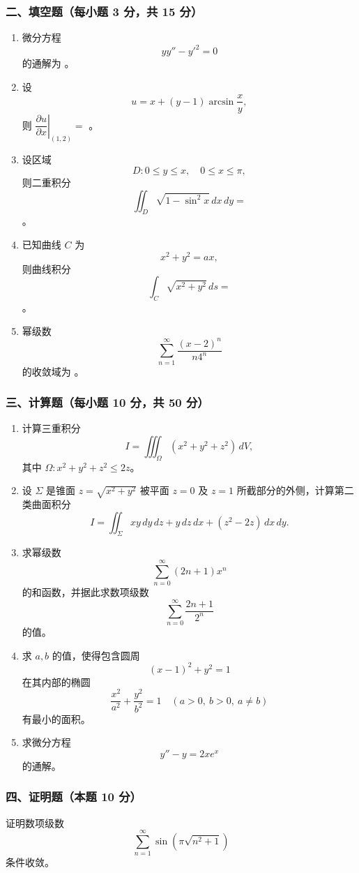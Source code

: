 \subsubsection*{二、填空题（每小题 3 分，共 15 分）}
\begin{enumerate}
  \item 微分方程
  \[
  yy''-y'^2=0
  \]
  的通解为 \underline{\hspace{4cm}}。
  \item 设
  \[
  u=x+(y-1)\arcsin\frac{x}{y},
  \]
  则 $\left.\dfrac{\partial u}{\partial x}\right|_{(1,2)}=$ \underline{\hspace{3cm}}。
  \item 设区域
  \[
  D:0\le y\le x,\quad 0\le x\le\pi,
  \]
  则二重积分
  \[
  \iint_D \sqrt{1-\sin^2x}\,dx\,dy=
  \]
  \underline{\hspace{3cm}}。
  \item 已知曲线 $C$ 为
  \[
  x^2+y^2=ax,
  \]
  则曲线积分
  \[
  \int_C\sqrt{x^2+y^2}\,ds=
  \]
  \underline{\hspace{3cm}}。
  \item 幂级数
  \[
  \sum_{n=1}^{\infty}\frac{(x-2)^n}{n4^n}
  \]
  的收敛域为 \underline{\hspace{4cm}}。
\end{enumerate}

\subsubsection*{三、计算题（每小题 10 分，共 50 分）}
\begin{enumerate}
  \item 计算三重积分
  \[
  I=\iiint_\Omega (x^2+y^2+z^2)\,dV,
  \]
  其中 $\Omega:x^2+y^2+z^2\le2z$。
  \item 设 $\Sigma$ 是锥面 $z=\sqrt{x^2+y^2}$ 被平面 $z=0$ 及 $z=1$ 所截部分的外侧，计算第二类曲面积分
  \[
  I=\iint_\Sigma xy\,dy\,dz+y\,dz\,dx+(z^2-2z)\,dx\,dy.
  \]
  \item 求幂级数
  \[
  \sum_{n=0}^{\infty}(2n+1)x^n
  \]
  的和函数，并据此求数项级数
  \[
  \sum_{n=0}^{\infty}\frac{2n+1}{2^n}
  \]
  的值。
  \item 求 $a,b$ 的值，使得包含圆周
  \[
  (x-1)^2+y^2=1
  \]
  在其内部的椭圆
  \[
  \frac{x^2}{a^2}+\frac{y^2}{b^2}=1\quad(a>0,\ b>0,\ a\ne b)
  \]
  有最小的面积。
  \item 求微分方程
  \[
  y''-y=2xe^x
  \]
  的通解。
\end{enumerate}

\subsubsection*{四、证明题（本题 10 分）}
证明数项级数
\[
\sum_{n=1}^{\infty}\sin(\pi\sqrt{n^2+1})
\]
条件收敛。

